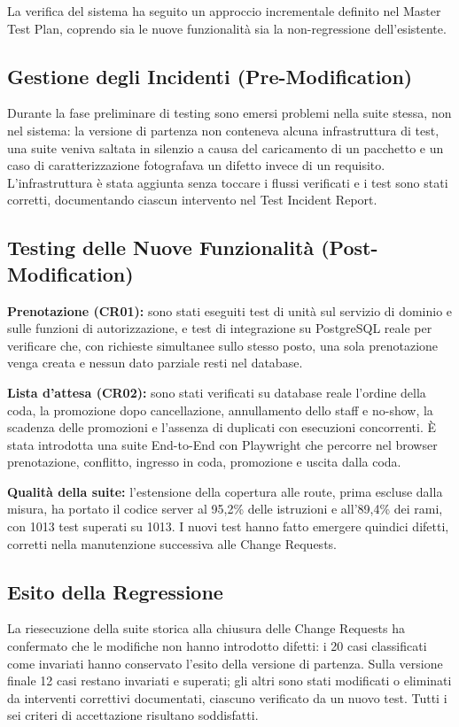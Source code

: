 \documentclass[11pt,a4paper,oneside,openany]{book}
\begin{document}
La verifica del sistema ha seguito un approccio incrementale definito nel
Master Test Plan, coprendo sia le nuove funzionalità sia la non-regressione
dell'esistente.

\subsection{Gestione degli Incidenti (Pre-Modification)}

Durante la fase preliminare di testing sono emersi problemi nella suite
stessa, non nel sistema: la versione di partenza non conteneva alcuna
infrastruttura di test, una suite veniva saltata in silenzio a causa del
caricamento di un pacchetto e un caso di caratterizzazione fotografava un
difetto invece di un requisito. L'infrastruttura è stata aggiunta senza
toccare i flussi verificati e i test sono stati corretti, documentando
ciascun intervento nel Test Incident Report.

\subsection{Testing delle Nuove Funzionalità (Post-Modification)}

\textbf{Prenotazione (CR01):} sono stati eseguiti test di unità sul servizio
di dominio e sulle funzioni di autorizzazione, e test di integrazione su
PostgreSQL reale per verificare che, con richieste simultanee sullo stesso
posto, una sola prenotazione venga creata e nessun dato parziale resti nel
database.

\textbf{Lista d'attesa (CR02):} sono stati verificati su database reale
l'ordine della coda, la promozione dopo cancellazione, annullamento dello
staff e no-show, la scadenza delle promozioni e l'assenza di duplicati con
esecuzioni concorrenti. È stata introdotta una suite End-to-End con
Playwright che percorre nel browser prenotazione, conflitto, ingresso in
coda, promozione e uscita dalla coda.

\textbf{Qualità della suite:} l'estensione della copertura alle route,
prima escluse dalla misura, ha portato il codice server al 95,2\% delle
istruzioni e all'89,4\% dei rami, con 1013 test superati su 1013. I nuovi test
hanno fatto emergere quindici difetti, corretti nella manutenzione
successiva alle Change Requests.

\subsection{Esito della Regressione}

La riesecuzione della suite storica alla chiusura delle Change Requests ha
confermato che le modifiche non hanno introdotto difetti: i 20 casi
classificati come invariati hanno conservato l'esito della versione di
partenza. Sulla versione finale 12 casi restano invariati e superati; gli
altri sono stati modificati o eliminati da interventi correttivi documentati,
ciascuno verificato da un nuovo test. Tutti i sei criteri di accettazione
risultano soddisfatti.
\end{document}
